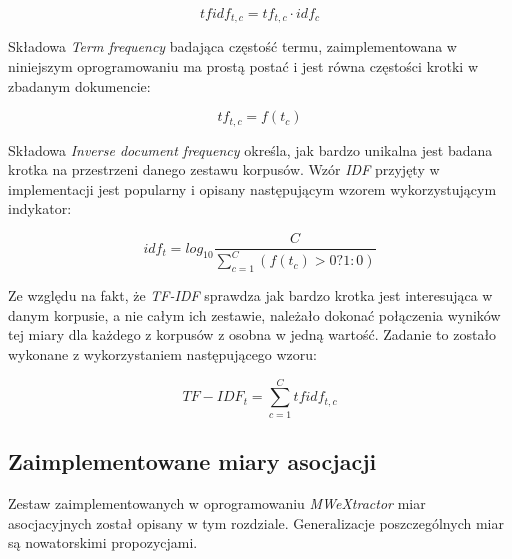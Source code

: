 \documentclass[11pt,a4paper]{llncs}
\begin{document}
$$ tfidf_{t, c} = tf_{t, c} \cdot idf_{c} $$

Składowa \emph{Term frequency} badająca częstość termu, zaimplementowana w niniejszym oprogramowaniu ma prostą postać i jest równa częstości krotki w zbadanym dokumencie:

$$ tf_{t,c} = f(t_{c}) $$

Składowa \emph{Inverse document frequency} określa, jak bardzo unikalna jest badana krotka na przestrzeni danego zestawu korpusów.
Wzór \emph{IDF} przyjęty w implementacji jest popularny i opisany następującym wzorem wykorzystującym indykator:

$$ idf_{t} = log_{10} \frac{C}{\sum_{c=1}^{C} (f(t_{c}) > 0 ? 1 : 0) } $$

Ze względu na fakt, że \emph{TF-IDF} sprawdza jak bardzo krotka jest interesująca w danym korpusie, a nie całym ich zestawie, należało dokonać połączenia wyników tej miary dla każdego z korpusów z osobna w jedną wartość.
Zadanie to zostało wykonane z wykorzystaniem następującego wzoru:

$$ TF-IDF_{t} = \sum_{c=1}^{C} tfidf_{t, c} $$


\subsection{Zaimplementowane miary asocjacji}
Zestaw zaimplementowanych w oprogramowaniu \emph{MWeXtractor} miar asocjacyjnych został opisany w tym rozdziale. Generalizacje poszczególnych miar są nowatorskimi propozycjami.
\end{document}
